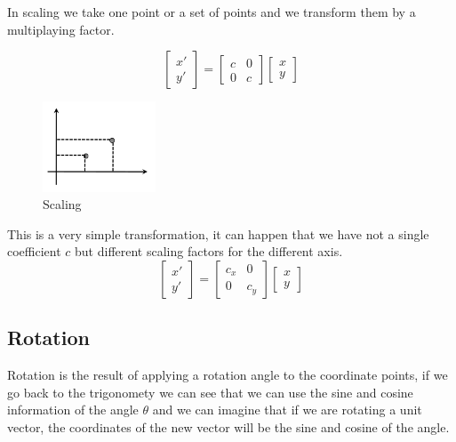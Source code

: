 In scaling we take one point or a set of points and we transform them by a multiplaying factor.

\[
\begin{bmatrix}
    x' \\
    y'
    \end{bmatrix}
    =
    \begin{bmatrix}
    c & 0 \\
    0 & c
    \end{bmatrix}
    \begin{bmatrix}
    x \\
    y
    \end{bmatrix}
\]

\begin{figure}[ht]
    \centering
    \includegraphics[width=0.3\textwidth]{Figures/scaling.png}
    \caption{Scaling}
    \label{fig:scaling}
\end{figure}

This is a very simple transformation, it can happen that we have not a single coefficient \(c\) but different scaling factors for the different axis.
\[
\begin{bmatrix}
    x' \\
    y'
    \end{bmatrix}
    =
    \begin{bmatrix}
    c_x & 0 \\
    0 & c_y
    \end{bmatrix}
    \begin{bmatrix}
    x \\
    y
    \end{bmatrix}
\]

\subsection{Rotation}

Rotation is the result of applying a rotation angle to the coordinate points, if we go back to the trigonomety we can see that we can use the sine and cosine information of the angle \(\theta\) and we can imagine that if we are rotating a unit vector, the coordinates of the new vector will be the sine and cosine of the angle.

